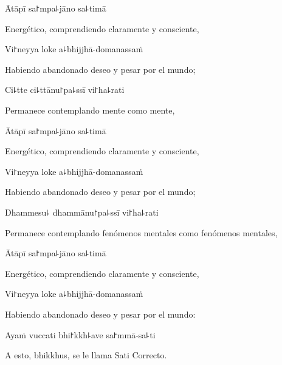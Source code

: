 \ifaivedition
\clearpage
\fi

Ātāpī sa꜓mpa꜕jāno sa꜕timā

\begin{english}
	Energético, comprendiendo claramente y consciente,
\end{english}

Vi꜓neyya loke a꜕bhijjhā-domanassaṁ

\begin{english}
	Habiendo abandonado deseo y pesar por el mundo;
\end{english}

Ci꜕tte ci꜕ttānu꜓pa꜕ssī vi꜓ha꜕rati

\begin{english}
	Permanece contemplando mente como mente,
\end{english}

Ātāpī sa꜓mpa꜕jāno sa꜕timā

\begin{english}
	Energético, comprendiendo claramente y consciente,
\end{english}

Vi꜓neyya loke a꜕bhijjhā-domanassaṁ

\begin{english}
	Habiendo abandonado deseo y pesar por el mundo;
\end{english}

Dhammesu꜕ dhammānu꜓pa꜕ssī vi꜓ha꜕rati

\begin{english}
	Permanece contemplando fenómenos mentales como fenómenos mentales,
\end{english}

Ātāpī sa꜓mpa꜕jāno sa꜕timā

\begin{english}
	Energético, comprendiendo claramente y consciente,
\end{english}

Vi꜓neyya loke a꜕bhijjhā-domanassaṁ

\begin{english}
	Habiendo abandonado deseo y pesar por el mundo:
\end{english}

Ayaṁ vuccati bhi꜓kkh꜕ave sa꜓mmā-sa꜕ti

\begin{english}
	A esto, bhikkhus, se le  llama Sati Correcto.
\end{english}

\ifaivedition
\clearpage
\fi

